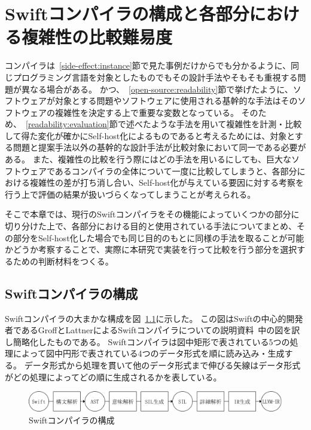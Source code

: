 \chapter{Swiftコンパイラの構成と各部分における複雑性の比較難易度}
\label{refinement}

コンパイラは~\ref{side-effect:instance}節で見た事例だけからでも分かるように、同じプログラミング言語を対象としたものでもその設計手法やそもそも重視する問題が異なる場合がある。
かつ、~\ref{open-source:readability}節で挙げたように、ソフトウェアが対象とする問題やソフトウェアに使用される基幹的な手法はそのソフトウェアの複雑性を決定する上で重要な変数となっている。
そのため、~\ref{readability:evaluation}節で述べたような手法を用いて複雑性を計測・比較して得た変化が確かにSelf-host化によるものであると考えるためには、対象とする問題と提案手法以外の基幹的な設計手法が比較対象において同一である必要がある。
また、複雑性の比較を行う際にはどの手法を用いるにしても、巨大なソフトウェアであるコンパイラの全体について一度に比較してしまうと、各部分における複雑性の差が打ち消し合い、Self-host化が与えている要因に対する考察を行う上で評価の結果が扱いづらくなってしまうことが考えられる。

そこで本章では、現行のSwiftコンパイラをその機能によっていくつかの部分に切り分けた上で、各部分における目的と使用されている手法についてまとめ、その部分をSelf-host化した場合でも同じ目的のもとに同様の手法を取ることが可能かどうか考察することで、実際に本研究で実装を行って比較を行う部分を選択するための判断材料をつくる。

\section{Swiftコンパイラの構成}
\label{refinement:structure}

Swiftコンパイラの大まかな構成を図~\ref{img:swift-compiler-process}に示した。
この図はSwiftの中心的開発者であるGroffとLattnerによるSwiftコンパイラについての説明資料~\cite{sil}中の図を訳し簡略化したものである。
Swiftコンパイラは図中矩形で表されている5つの処理によって図中円形で表されている4つのデータ形式を順に読み込み・生成する。
データ形式から処理を貫いて他のデータ形式まで伸びる矢線はデータ形式がどの処理によってどの順に生成されるかを表している。

\begin{figure}
    \begin{center}
        \includegraphics[scale=0.5]{./img/swift_compiler_process.png}
        \caption{Swiftコンパイラの構成}
        \label{img:swift-compiler-process}
    \end{center}
\end{figure}


